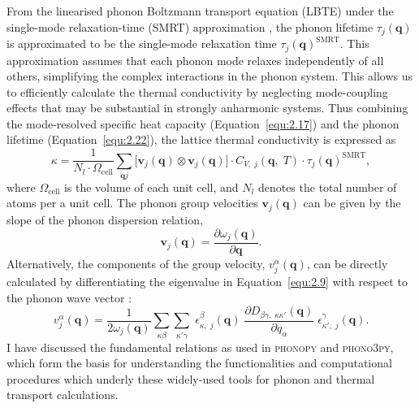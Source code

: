 From the linearised phonon Boltzmann transport equation (LBTE) under the single-mode relaxation-time (SMRT) approximation \cite{srivastava_1990}, the phonon lifetime \( \tau_j(\mathbf{q}) \) is approximated to be the single-mode relaxation time \( \tau_j(\mathbf{q})^{\text{SMRT}} \).
This approximation assumes that each phonon mode relaxes independently of all others, simplifying the complex interactions in the phonon system. This allows us to efficiently calculate the thermal conductivity by neglecting mode-coupling effects that may be substantial in strongly anharmonic systems.
Thus combining the mode-resolved specific heat capacity (Equation~\eqref{equ:2.17}) and the phonon lifetime (Equation~\eqref{equ:2.22}), the lattice thermal conductivity is expressed as
\begin{equation}
\label{equ:2.23}
       \kappa = \frac{1}{N_{l}\cdot \Omega_{\text{cell}}}\sum_{\mathbf{q}j}\Big[\mathbf{v}_{j}(\mathbf{q})\otimes \mathbf{v}_{j}(\mathbf{q})\Big]\cdot C_{V,\;j}(\mathbf{q},\;T)\cdot \tau_{j}(\mathbf{q})^{\text{SMRT}},
\end{equation}
where $\Omega_{\text{cell}}$ is the volume of each unit cell, and $N_{l}$ denotes the total number of atoms per a unit cell.
The phonon group velocities $\mathbf{v}_{j}(\mathbf{q})$ can be given by the slope of the phonon dispersion relation,
\begin{equation}
\label{equ:2.24}
   \mathbf{v}_{j}(\mathbf{q})=\frac{\partial \omega_{j}(\mathbf{q})}{\partial \mathbf{q}}.
\end{equation}
Alternatively, the components of the group velocity, $v^{\alpha}_{j}(\mathbf{q})$, can be directly calculated by differentiating the eigenvalue in Equation~\eqref{equ:2.9} with respect to the phonon wave vector \cite{Togo2015-qf}:
\begin{equation}
\label{equ:2.25}
        v^{\alpha}_{j}(\mathbf{q}) = \frac{1}{2\omega_{j}(\mathbf{q})}\sum_{\kappa\beta}\sum_{\kappa'\gamma}\;\epsilon^{\beta}_{\kappa,\;j}(\mathbf{q})
        \;\frac{\partial D_{\beta\gamma,\;\kappa\kappa'}(\mathbf{q})}{\partial q_{\alpha}}\;\epsilon^{\gamma}_{\kappa',\;j}(\mathbf{q}).
\end{equation}
I have discussed the fundamental relations as used in \textsc{phonopy} and \textsc{phono3py}, which form the basis for understanding the functionalities and computational procedures which underly these widely-used tools for phonon and thermal transport calculations.

